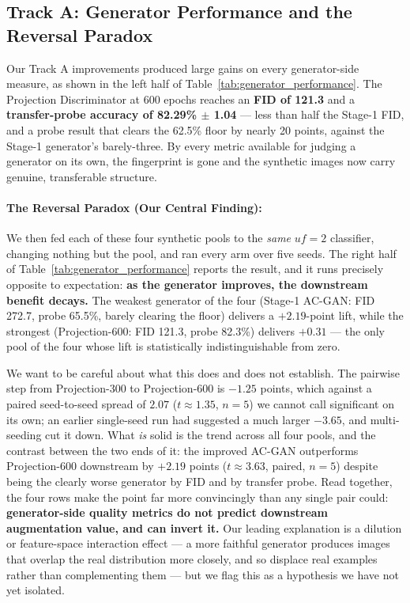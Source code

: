 \documentclass[11pt]{article}
\begin{document}
\subsection{Track A: Generator Performance and the Reversal Paradox}
Our Track A improvements produced large gains on every generator-side measure, as shown in the left half of Table~\ref{tab:generator_performance}. The Projection Discriminator at 600 epochs reaches an \textbf{FID of 121.3} and a \textbf{transfer-probe accuracy of 82.29\% $\pm$ 1.04} --- less than half the Stage-1 FID, and a probe result that clears the 62.5\% floor by nearly 20 points, against the Stage-1 generator's barely-three. By every metric available for judging a generator on its own, the fingerprint is gone and the synthetic images now carry genuine, transferable structure.

\paragraph{The Reversal Paradox (Our Central Finding):}
We then fed each of these four synthetic pools to the \emph{same} $uf{=}2$ classifier, changing nothing but the pool, and ran every arm over five seeds. The right half of Table~\ref{tab:generator_performance} reports the result, and it runs precisely opposite to expectation: \textbf{as the generator improves, the downstream benefit decays.} The weakest generator of the four (Stage-1 AC-GAN: FID 272.7, probe 65.5\%, barely clearing the floor) delivers a $+2.19$-point lift, while the strongest (Projection-600: FID 121.3, probe 82.3\%) delivers $+0.31$ --- the only pool of the four whose lift is statistically indistinguishable from zero.

We want to be careful about what this does and does not establish. The pairwise step from Projection-300 to Projection-600 is $-1.25$ points, which against a paired seed-to-seed spread of $2.07$ ($t \approx 1.35$, $n{=}5$) we cannot call significant on its own; an earlier single-seed run had suggested a much larger $-3.65$, and multi-seeding cut it down. What \emph{is} solid is the trend across all four pools, and the contrast between the two ends of it: the improved AC-GAN outperforms Projection-600 downstream by $+2.19$ points ($t \approx 3.63$, paired, $n{=}5$) despite being the clearly worse generator by FID and by transfer probe. Read together, the four rows make the point far more convincingly than any single pair could: \textbf{generator-side quality metrics do not predict downstream augmentation value, and can invert it.} Our leading explanation is a dilution or feature-space interaction effect --- a more faithful generator produces images that overlap the real distribution more closely, and so displace real examples rather than complementing them --- but we flag this as a hypothesis we have not yet isolated.
\end{document}
